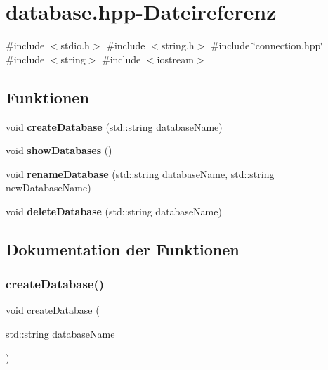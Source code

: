 \section{database.\+hpp-\/\+Dateireferenz}
\label{database_8hpp}
{\ttfamily \#include $<$stdio.\+h$>$}\newline
{\ttfamily \#include $<$string.\+h$>$}\newline
{\ttfamily \#include \char`\"{}connection.\+hpp\char`\"{}}\newline
{\ttfamily \#include $<$string$>$}\newline
{\ttfamily \#include $<$iostream$>$}\newline
\subsection*{Funktionen}
\begin{DoxyCompactItemize}
\item 
void \textbf{ create\+Database} (std\+::string database\+Name)
\item 
void \textbf{ show\+Databases} ()
\item 
void \textbf{ rename\+Database} (std\+::string database\+Name, std\+::string new\+Database\+Name)
\item 
void \textbf{ delete\+Database} (std\+::string database\+Name)
\end{DoxyCompactItemize}


\subsection{Dokumentation der Funktionen}
\mbox{\label{database_8hpp_abf48eb274e662a7de3f5f190d126b765}} 
\subsubsection{create\+Database()}
{\footnotesize\ttfamily void create\+Database (\begin{DoxyParamCaption}\item[{std\+::string}]{database\+Name }\end{DoxyParamCaption})}

\mbox{\label{database_8hpp_a1d1fac4a7c1506f81908532050a8e58f}} 

